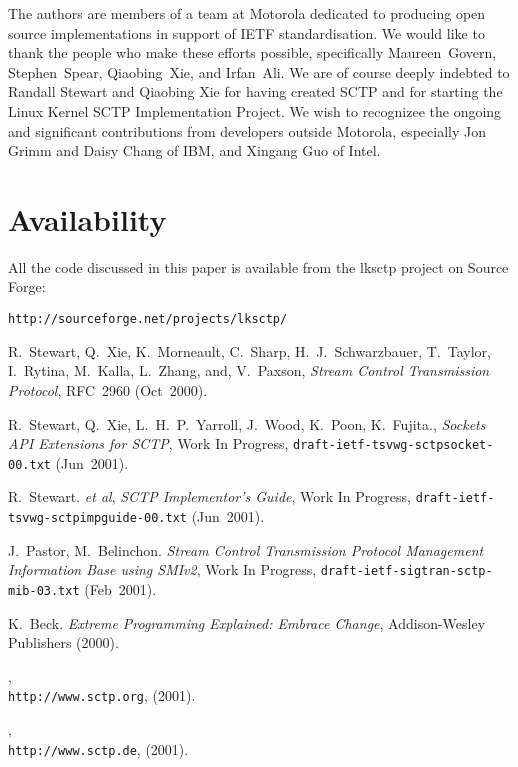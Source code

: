 \documentclass[twocolumn]{article}
\begin{document}
The authors are members of a team at Motorola dedicated to producing
open source implementations in support of IETF standardisation.  We
would like to thank the people who make these efforts possible,
specifically Maureen~Govern, Stephen~Spear, Qiaobing~Xie, and
Irfan~Ali.  We are of course deeply indebted to Randall Stewart and
Qiaobing Xie for having created SCTP and for starting the Linux Kernel
SCTP Implementation Project.  We wish to recognizee the ongoing and
significant contributions from developers outside Motorola, especially
Jon Grimm and Daisy Chang of IBM, and Xingang Guo of Intel.

\section{Availability}

All the code discussed in this paper is available from the lksctp
project on Source Forge:

\begin{center}
\texttt{http://sourceforge.net/projects/lksctp/}
\end{center}

\begin{thebibliography}{2001}

 R.~Stewart, Q.~Xie, K.~Morneault, C.~Sharp,
H.~J.~Schwarzbauer, T.~Taylor, I.~Rytina, M.~Kalla, L.~Zhang, and,
V.~Paxson, {\em Stream Control Transmission Protocol}, RFC~2960 (Oct~2000).

 R.~Stewart, Q.~Xie, L.~H.~P.~Yarroll, J.~Wood,
K.~Poon, K.~Fujita., {\em Sockets API Extensions for SCTP}, Work In
Progress, \texttt{draft-ietf-tsvwg-sctpsocket-00.txt} (Jun~2001).

 R.~Stewart. {\it et al}, 
{\em SCTP Implementor's Guide}, Work In Progress,
\texttt{draft-ietf-tsvwg-sctpimpguide-00.txt} (Jun~2001).

 J.~Pastor, M.~Belinchon. {\em Stream Control
Transmission Protocol Management Information Base using SMIv2}, Work
In Progress, \texttt{draft-ietf-sigtran-sctp-mib-03.txt} (Feb~2001).

 K.~Beck. {\em Extreme Programming Explained: Embrace
Change}, Addison-Wesley Publishers (2000).

,\\
\texttt{http://www.sctp.org}, (2001).

,\\
\texttt{http://www.sctp.de}, (2001).

\end{thebibliography}
\end{document}
